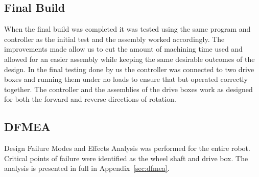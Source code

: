 \subsection{Final Build}
When the final build was completed it was tested using the same program and controller as the initial test and the assembly worked accordingly. The improvements made allow us to cut the amount of machining time used and allowed for an easier assembly while keeping the same desirable outcomes of the design. In the final testing done by us the controller was connected to two drive boxes and running them under no loads to ensure that but operated correctly together. The controller and the assemblies of the drive boxes work as designed for both the forward and reverse directions of rotation.

\subsection{DFMEA}

Design Failure Modes and Effects Analysis was performed for the entire robot. Critical points of failure were identified as the wheel shaft and drive box. The analysis is presented in full in Appendix~\ref{sec:dfmea}.

